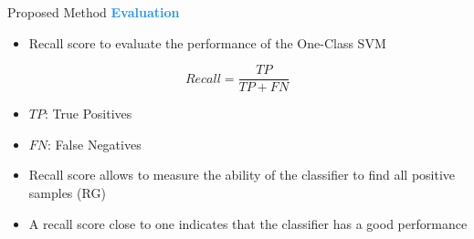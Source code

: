 \begin{frame}{Proposed Method}
    \Large\textcolor{dodgerblue}{\textbf{Evaluation}}
    \normalsize
    \vspace{7pt}
    \begin{itemize}
        \item Recall score to evaluate the performance of the One-Class SVM
        \vspace{8pt}
    \end{itemize}
    \Large
    \begin{equation*}
        Recall = \frac{TP}{TP + FN}
    \end{equation*}
    \begin{itemize}
        \normalsize
        \vspace{4pt}
        \item $TP$: True Positives
        \vspace{2pt}
        \item $FN$: False Negatives
        \vspace{2pt}
        \item Recall score allows to measure the ability of the classifier to find all positive samples (RG)
        \vspace{2pt}
        \item A recall score close to one indicates that the classifier has a good performance
    \end{itemize}
\end{frame}